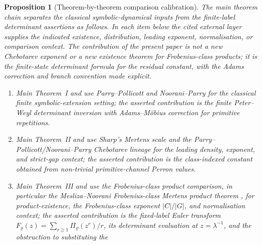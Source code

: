 \documentclass[11pt,a4paper]{amsart}
\theoremstyle{plain}
\newtheorem{proposition}[theorem]{Proposition}
\theoremstyle{definition}
\theoremstyle{remark}
\begin{document}
\begin{proposition}[Theorem-by-theorem comparison calibration]
  \label{prop:theorem-by-theorem-comparison-calibration}
  \label{rem:main-theorem-literature-comparison}
  \label{rem:theorem-by-theorem-comparison-calibration}
  \label{rem:main-theorem-comparison-context}
  The main theorem chain separates the classical symbolic-dynamical inputs
  from the finite-label determinant assertions as follows.  In each item below
  the cited external layer supplies the indicated existence, distribution,
  leading exponent, normalisation, or comparison context.  The contribution of
  the present paper is not a new Chebotarev exponent or a new existence theorem
  for Frobenius-class products; it is the finite-state determinant formula for
  the residual constant, with the Adams correction and branch convention made
  explicit.
  \begin{enumerate}[label=\textup{(\roman*)},leftmargin=*]
    \item Main Theorem~I and
    use Parry--Pollicott \cite{ParryPollicott1986Chebotarev} and
    Noorani--Parry \cite{NooraniParry1992ChebotarevShifts} for the classical
    finite symbolic-extension setting; the asserted contribution is
    the finite
    Peter--Weyl determinant inversion with Adams--M\"obius correction for
    primitive repetitions.
    \item Main Theorem~II and
    use Sharp's Mertens scale \cite{Sharp1991Mertens} and the
    Parry--Pollicott/Noorani--Parry Chebotarev lineage for the leading density,
    exponent, and strict-gap context; the asserted contribution is the
    class-indexed constant obtained from non-trivial primitive-channel Perron
    values.
    \item Main Theorem~III and
    use the Frobenius-class product comparison, in particular the
    Mesliza--Noorani Frobenius-class Mertens product theorem
    \cite{MeslizaNoorani1999FrobeniusMertens}, for product-existence, the
    Frobenius-class exponent \(|C|/|G|\), and normalisation context; the
    asserted contribution is the fixed-label Euler transform
    \(F_\varrho(z)=\sum_{r\ge1}\Pi_\varrho(z^r)/r\), its determinant
    evaluation at \(z=\lambda^{-1}\), and the obstruction to substituting the

\end{enumerate}
\end{proposition}
\end{document}

